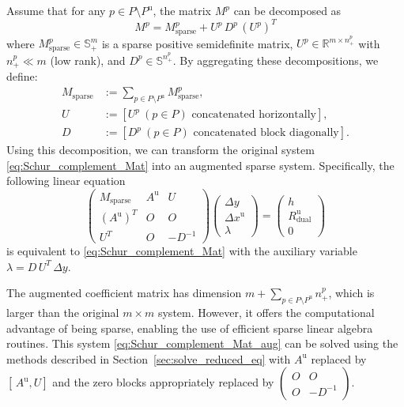 Assume that for any $p\in P\setminus P^{\text{u}}$, the matrix $M^p$ can be decomposed as
\begin{equation}
  M^p = M^p_{\mathrm{sparse}} + U^p\, D^p\, (U^p)^T
  \label{eq:low_rank_perturbation}
\end{equation}
where $M^p_{\mathrm{sparse}} \in \mathbb{S}^m_+$ is a sparse positive semidefinite matrix, 
$U^p \in \mathbb{R}^{m\times n^p_+}$ with $n^p_+ \ll m$ (low rank), 
and $D^p\in \mathbb{S}^{n^p_+}$.
By aggregating these decompositions, we define:
\begin{align*}
  M_{\mathrm{sparse}} &:= \sum_{p\in P\setminus P^{\text{u}}} M^p_{\mathrm{sparse}}, \\
  U &:= [U^p ~ (p\in P) \text{ concatenated horizontally}], \\
  D &:= [D^p ~ (p\in P) \text{ concatenated block diagonally}].
\end{align*}
Using this decomposition, we can transform the original system \eqref{eq:Schur_complement_Mat} 
into an augmented sparse system. Specifically, the following linear equation
\begin{equation}
  \begin{pmatrix}
    M_{\mathrm{sparse}} & A^{\text{u}} & U \\
    (A^{\text{u}})^T & O & O \\
    U^T & O & -D^{-1}
  \end{pmatrix}
  \begin{pmatrix}
    \Delta y \\
    \Delta x^{\text{u}} \\
    \lambda
  \end{pmatrix}
  =
  \begin{pmatrix}
    h \\
    R^{\text{u}}_{\text{dual}} \\
    0
  \end{pmatrix}
  \label{eq:Schur_complement_Mat_aug}
\end{equation}
is equivalent to \eqref{eq:Schur_complement_Mat} with the auxiliary variable $\lambda = D\,U^T\,\Delta y$.

The augmented coefficient matrix has dimension $m+\sum_{p\in P\setminus P^{\text{u}}} n^p_+$, 
which is larger than the original $m \times m$ system. 
However, it offers the computational advantage of being sparse, 
enabling the use of efficient sparse linear algebra routines.
This system \eqref{eq:Schur_complement_Mat_aug} can be solved using the methods 
described in Section~\ref{sec:solve_reduced_eq} with 
$A^{\text{u}}$ replaced by $[\,A^{\text{u}}, U]$ and the zero blocks appropriately replaced by 
$\begin{pmatrix} O & O \\ O & -D^{-1} \end{pmatrix}$.

